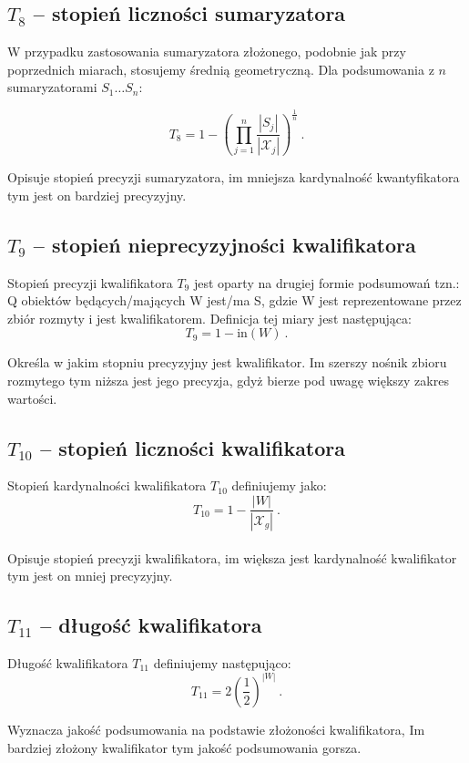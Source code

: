 \documentclass{classrep}
\begin{document}
\subsection{\(T_8\) -- stopień liczności sumaryzatora}
W przypadku zastosowania sumaryzatora złożonego, podobnie jak przy poprzednich miarach, stosujemy średnią geometryczną.
Dla podsumowania z \(n\) sumaryzatorami \(S_1 \ldots S_n\):

\[T_8 = 1- \left(\prod_{j=1}^{n} \frac{|S_j|}{|\mathcal{X}_j|}\right)^{\frac{1}{n}} ~\mbox{.}\]

Opisuje stopień precyzji sumaryzatora, im mniejsza kardynalność kwantyfikatora tym jest on bardziej precyzyjny.

\subsection{\(T_9\) -- stopień nieprecyzyjności kwalifikatora}
Stopień precyzji kwalifikatora \(T_9\) jest oparty na drugiej formie podsumowań tzn.: Q obiektów będących/mających W jest/ma S, gdzie W jest reprezentowane przez zbiór rozmyty i jest kwalifikatorem. Definicja tej miary jest następująca:
\[T_9 = 1-\mathrm{in}(W) ~\mbox{.}\]

Określa w jakim stopniu precyzyjny jest kwalifikator. Im szerszy nośnik zbioru rozmytego tym niższa jest jego precyzja, gdyż bierze pod uwagę większy zakres wartości. 


\subsection{\(T_{10}\) -- stopień liczności kwalifikatora}
Stopień kardynalności kwalifikatora \(T_{10}\) definiujemy jako:
\[T_{10} = 1-\frac{|W|}{|\mathcal{X}_g|} ~\mbox{.}\]\\

Opisuje stopień precyzji kwalifikatora, im większa jest kardynalność kwalifikator tym jest on mniej precyzyjny.

\subsection{\(T_{11}\) -- długość kwalifikatora}
Długość kwalifikatora \(T_{11}\) definiujemy następująco:
\[T_{11} = 2\left(\frac{1}{2}\right)^{|W|} ~\mbox{.}\]

Wyznacza jakość podsumowania na podstawie złożoności kwalifikatora, Im bardziej złożony kwalifikator tym jakość podsumowania gorsza.

\vspace\baselineskip
\end{document}
